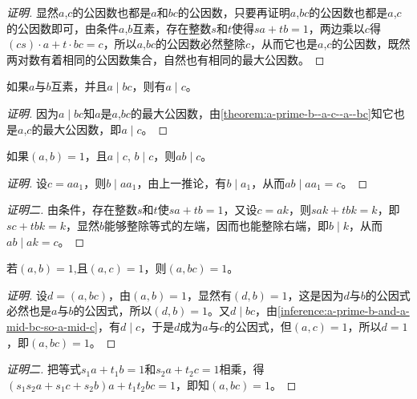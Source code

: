 \begin{proof}[证明]
  显然$a$,$c$的公因数也都是$a$和$bc$的公因数，只要再证明$a$,$bc$的公因数也都是$a$,$c$的公因数即可，由条件$a$,$b$互素，存在整数$s$和$t$使得$sa+tb=1$，两边乘以$c$得$(cs)\cdot a+t\cdot bc=c$，所以$a$,$bc$的公因数必然整除$c$，从而它也是$a$,$c$的公因数，既然两对数有着相同的公因数集合，自然也有相同的最大公因数。
\end{proof}

\begin{inference}
  \label{inference:a-prime-b-and-a-mid-bc-so-a-mid-c}
  如果$a$与$b$互素，并且$a \mid bc$，则有$a \mid c$。
\end{inference}

\begin{proof}[证明]
  因为$a \mid bc$知$a$是$a$,$bc$的最大公因数，由\autoref{theorem:a-prime-b--a-c--a--bc}知它也是$a$,$c$的最大公因数，即$a \mid c$。
\end{proof}

\begin{inference}
  如果$(a,b)=1$，且$a \mid c$, $b \mid c$，则$ab \mid c$。
\end{inference}

\begin{proof}[证明]
  设$c=aa_1$，则$b \mid aa_1$，由上一推论，有$b \mid a_1$，从而$ab \mid aa_1=c$。
\end{proof}

\begin{proof}[证明二]
  由条件，存在整数$s$和$t$使$sa+tb=1$，又设$c=ak$，则$sak+tbk=k$，即$sc+tbk=k$，显然$b$能够整除等式的左端，因而也能整除右端，即$b \mid k$，从而$ab \mid ak=c$。
\end{proof}

\begin{inference}
  \label{inference:a-prime-b-and-a-prime-c-so-a-prime-bc}
  若$(a,b)=1$,且$(a,c)=1$，则$(a,bc)=1$。
\end{inference}

\begin{proof}[证明]
  设$d=(a,bc)$，由$(a,b)=1$，显然有$(d,b)=1$，这是因为$d$与$b$的公因式必然也是$a$与$b$的公因式，所以$(d,b)=1$。又$d \mid bc$，由\autoref{inference:a-prime-b-and-a-mid-bc-so-a-mid-c}，有$d \mid c$，于是$d$成为$a$与$c$的公因式，但$(a,c)=1$，所以$d=1$，即$(a,bc)=1$。
\end{proof}

\begin{proof}[证明二]
  把等式$s_1a+t_1b=1$和$s_2a+t_2c=1$相乘，得$(s_1s_2a+s_1c+s_2b)a+t_1t_2bc=1$，即知$(a,bc)=1$。
\end{proof}

